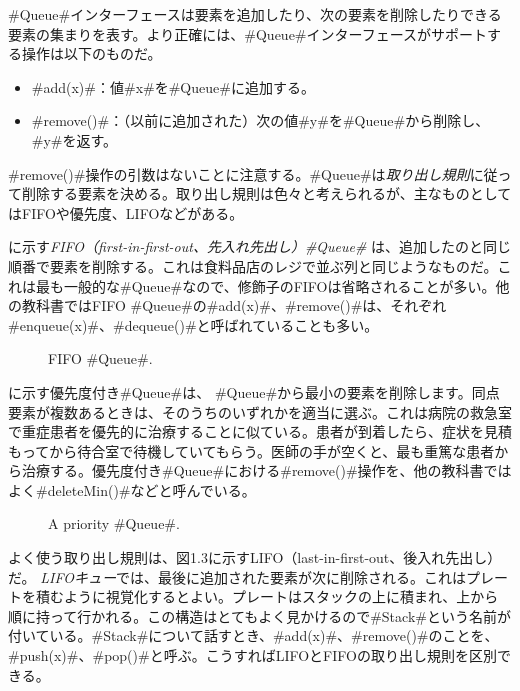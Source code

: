 #Queue#インターフェースは要素を追加したり、次の要素を削除したりできる要素の集まりを表す。より正確には、#Queue#インターフェースがサポートする操作は以下のものだ。

\begin{itemize}
  \item #add(x)#：値#x#を#Queue#に追加する。
  \item #remove()#：（以前に追加された）次の値#y#を#Queue#から削除し、#y#を返す。
\end{itemize}

#remove()#操作の引数はないことに注意する。#Queue#は\emph{取り出し規則}に従って削除する要素を決める。取り出し規則は色々と考えられるが、主なものとしてはFIFOや優先度、LIFOなどがある。

に示す\emph{FIFO（first-in-first-out、先入れ先出し）#Queue#} は、追加したのと同じ順番で要素を削除する。これは食料品店のレジで並ぶ列と同じようなものだ。これは最も一般的な#Queue#なので、修飾子のFIFOは省略されることが多い。他の教科書ではFIFO #Queue#の#add(x)#、#remove()#は、それぞれ#enqueue(x)#、#dequeue()#と呼ばれていることも多い。

\begin{figure}
  \caption[FIFOキュー]{FIFO #Queue#.}
\end{figure}

に示す優先度付き#Queue#は、
%
%
%
#Queue#から最小の要素を削除します。同点要素が複数あるときは、そのうちのいずれかを適当に選ぶ。これは病院の救急室で重症患者を優先的に治療することに似ている。患者が到着したら、症状を見積もってから待合室で待機していてもらう。医師の手が空くと、最も重篤な患者から治療する。優先度付き#Queue#における#remove()#操作を、他の教科書ではよく#deleteMin()#などと呼んでいる。

\begin{figure}
  \caption[優先度付きキュー]{A priority #Queue#.}
\end{figure}

よく使う取り出し規則は、図1.3に示すLIFO（last-in-first-out、後入れ先出し）
%
%
%
%
だ。 \emph{LIFOキュー}では、最後に追加された要素が次に削除される。これはプレートを積むように視覚化するとよい。プレートはスタックの上に積まれ、上から順に持って行かれる。この構造はとてもよく見かけるので#Stack#という名前が付いている。#Stack#について話すとき、#add(x)#、#remove()#のことを、#push(x)#、#pop()#と呼ぶ。こうすればLIFOとFIFOの取り出し規則を区別できる。

